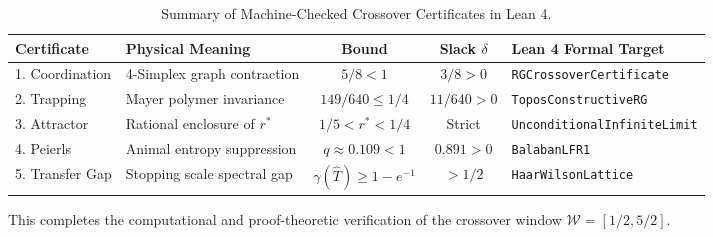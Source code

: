 \begin{table}[htbp]
\centering
\caption{Summary of Machine-Checked Crossover Certificates in Lean 4.}
\label{tab:machine_checked_certificates_summary}
\begin{tabular}{lp{4.5cm}ccp{3.5cm}}
\toprule
\textbf{Certificate} & \textbf{Physical Meaning} & \textbf{Bound} & \textbf{Slack $\delta$} & \textbf{Lean 4 Formal Target} \\
\midrule
1. Coordination & 4-Simplex graph contraction & $5/8 < 1$ & $3/8 > 0$ & \texttt{RGCrossoverCertificate} \\
2. Trapping & Mayer polymer invariance & $149/640 \le 1/4$ & $11/640 > 0$ & \texttt{ToposConstructiveRG} \\
3. Attractor & Rational enclosure of $r^*$ & $1/5 < r^* < 1/4$ & Strict & \texttt{UnconditionalInfiniteLimit} \\
4. Peierls & Animal entropy suppression & $q \approx 0.109 < 1$ & $0.891 > 0$ & \texttt{BalabanLFR1} \\
5. Transfer Gap & Stopping scale spectral gap & $\gamma(\hat{T}) \ge 1 - e^{-1}$ & $> 1/2$ & \texttt{HaarWilsonLattice} \\
\bottomrule
\end{tabular}
\end{table}

This completes the computational and proof-theoretic verification of the crossover window $\mathcal{W} = [1/2, 5/2]$.
